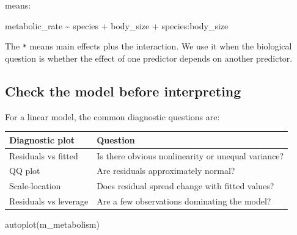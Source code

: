 \documentclass[
  letterpaper,
  8pt,
  a4paper]{book}
\newenvironment{Shaded}{\begin{snugshade}}{\end{snugshade}}
\newcommand{\FunctionTok}[1]{\textcolor[rgb]{0.28,0.35,0.67}{#1}}
\newcommand{\NormalTok}[1]{\textcolor[rgb]{0.00,0.23,0.31}{#1}}
\newcounter{none} %
\begin{document}
means:

\begin{Shaded}
\begin{Highlighting}[]
\NormalTok{metabolic\_rate \textasciitilde{} species + body\_size + species:body\_size}
\end{Highlighting}
\end{Shaded}

The \texttt{*} means main effects plus the interaction. We use it when
the biological question is whether the effect of one predictor depends
on another predictor.

\subsection*{Check the model before
interpreting}\label{check-the-model-before-interpreting}

For a linear model, the common diagnostic questions are:

{\def\LTcaptype{none} %
\begin{longtable}[]{@{}
  >{\raggedright\arraybackslash}p{}
  >{\raggedright\arraybackslash}p{}@{}}
\toprule\noalign{}
\begin{minipage}[b]{\linewidth}\raggedright
Diagnostic plot
\end{minipage} & \begin{minipage}[b]{\linewidth}\raggedright
Question
\end{minipage} \\
\midrule\noalign{}
\endhead
\bottomrule\noalign{}
\endlastfoot
Residuals vs fitted & Is there obvious nonlinearity or unequal
variance? \\
QQ plot & Are residuals approximately normal? \\
Scale-location & Does residual spread change with fitted values? \\
Residuals vs leverage & Are a few observations dominating the model? \\
\end{longtable}
}

\begin{Shaded}
\begin{Highlighting}[]
\FunctionTok{autoplot}\NormalTok{(m\_metabolism)}
\end{Highlighting}
\end{Shaded}
\end{document}
